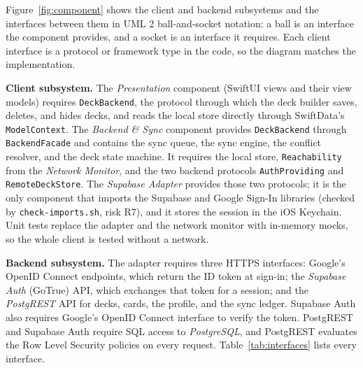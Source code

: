 \documentclass[12pt,letterpaper]{article}
\begin{document}
Figure~\ref{fig:component} shows the client and backend subsystems and the interfaces
between them in UML 2 ball-and-socket notation: a ball is an interface the component
provides, and a socket is an interface it requires. Each client interface is a protocol
or framework type in the code, so the diagram matches the implementation.

\textbf{Client subsystem.} The \emph{Presentation} component (SwiftUI views and their
view models) requires \texttt{DeckBackend}, the protocol through which the deck builder
saves, deletes, and hides decks, and reads the local store directly through SwiftData's
\texttt{ModelContext}. The \emph{Backend \& Sync} component provides
\texttt{DeckBackend} through \texttt{BackendFacade} and contains the sync queue, the
sync engine, the conflict resolver, and the deck state machine. It requires the local
store, \texttt{Reachability} from the \emph{Network Monitor}, and the two backend
protocols \texttt{AuthProviding} and \texttt{RemoteDeckStore}. The \emph{Supabase
Adapter} provides those two protocols; it is the only component that imports the
Supabase and Google Sign-In libraries (checked by \texttt{check-imports.sh}, risk R7),
and it stores the session in the iOS Keychain. Unit tests replace the adapter and the
network monitor with in-memory mocks, so the whole client is tested without a network.

\textbf{Backend subsystem.} The adapter requires three HTTPS interfaces: Google's OpenID
Connect endpoints, which return the ID token at sign-in; the \emph{Supabase Auth}
(GoTrue) API, which exchanges that token for a session; and the \emph{PostgREST} API for
decks, cards, the profile, and the sync ledger. Supabase Auth also requires Google's
OpenID Connect interface to verify the token. PostgREST and Supabase Auth require SQL
access to \emph{PostgreSQL}, and PostgREST evaluates the Row Level Security policies on
every request. Table~\ref{tab:interfaces} lists every interface.
\end{document}
